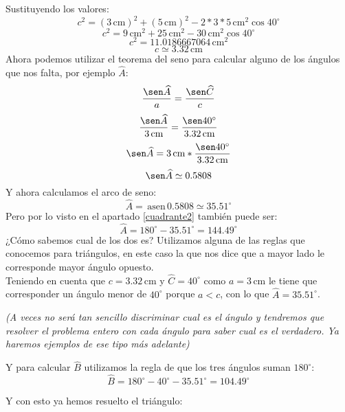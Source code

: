 \documentclass[a4paper,11pt,answers]{exam}
\newcommand{\degree}{^\circ}
\newcommand{\asen}{\,\mathrm{asen}\,}
\newcommand\unidad[1]{\,\text{#1}}
\begin{document}
\begin{solution}
  Sustituyendo los valores:
  \[c^2 = (3\unidad{cm})^2 + (5\unidad{cm})^2 - 2*3*5\unidad{cm}^2 \cos 40\degree\]
  \[c^2 = 9\unidad{cm}^2 + 25 \unidad{cm}^2 - 30\unidad{cm}^2 \cos 40\degree\]
  \[c^2 = 11.0186667064 \unidad{cm}^2\]
  \[c \simeq 3.32\unidad{cm}\]
  Ahora podemos utilizar el teorema del seno para calcular alguno de los ángulos que nos falta,
  por ejemplo $\widehat{A}$:
  \[\frac{\sen \widehat{A}}{a}=\frac{\sen \widehat{C}}{c}\]
  \[\frac{\sen \widehat{A}}{3\unidad{cm}}=\frac{\sen 40\degree}{3.32\unidad{cm}}\]
  \[\sen \widehat{A}=3\unidad{cm}*\frac{\sen 40\degree}{3.32\unidad{cm}}\]
  \[\sen \widehat{A} \simeq 0.5808\]
  Y ahora calculamos el arco de seno:
  \[\widehat{A} = \asen 0.5808 \simeq 35.51\degree\]
  Pero por lo visto en el apartado \ref{cuadrante2} también puede ser:
  \[\widehat{A} = 180\degree - 35.51\degree = 144.49\degree\]
  ¿Cómo sabemos cual de los dos es? Utilizamos alguna de las reglas que conocemos para triángulos,
  en este caso la que nos dice que a mayor lado le corresponde mayor ángulo opuesto.\\
  Teniendo en cuenta que $c=3.32\unidad{cm}$ y $\widehat{C} = 40\degree$ como $a = 3\unidad{cm}$
  le tiene que corresponder un ángulo menor de $40\degree$ porque $a < c$, con lo que
  $\widehat{A} = 35.51\degree$.\\
  \begin{center}\small{\emph{(A veces no será tan sencillo discriminar cual es el ángulo y tendremos
        que resolver el problema entero con cada ángulo para saber cual es el verdadero.
        Ya haremos ejemplos de ese tipo más adelante)}}\end{center}
  Y para calcular $\widehat{B}$ utilizamos la regla de que los tres ángulos suman $180\degree$:
  \[\widehat{B} = 180\degree - 40\degree - 35.51\degree = 104.49\degree\]

  Y con esto ya hemos resuelto el triángulo:
  \begin{center}
  \end{center}
\end{solution}
\end{document}
